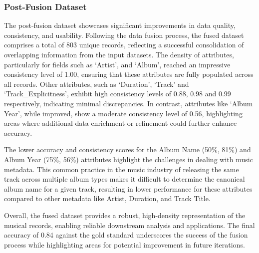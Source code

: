 \documentclass[runningheads]{llncs}
\begin{document}
\subsubsection{Post-Fusion Dataset}
The post-fusion dataset showcases significant improvements in data quality, consistency, and usability. Following the data fusion process, the fused dataset comprises a total of 803 unique records, reflecting a successful consolidation of overlapping information from the input datasets. The density of attributes, particularly for fields such as `Artist', and `Album', reached an impressive consistency level of 1.00, ensuring that these attributes are fully populated across all records. Other attributes, such as `Duration', `Track' and `Track\_Explicitness', exhibit high consistency levels of 0.88, 0.98 and 0.99 respectively, indicating minimal discrepancies. In contrast, attributes like `Album Year', while improved, show a moderate consistency level of 0.56, highlighting areas where additional data enrichment or refinement could further enhance accuracy.

The lower accuracy and consistency scores for the Album Name (50\%, 81\%) and Album Year (75\%, 56\%) attributes highlight the challenges in dealing with music metadata. This common practice in the music industry of releasing the same track across multiple album types makes it difficult to determine the canonical album name for a given track, resulting in lower performance for these attributes compared to other metadata like Artist, Duration, and Track Title.

Overall, the fused dataset provides a robust, high-density representation of the musical records, enabling reliable downstream analysis and applications. The final accuracy of 0.84 against the gold standard underscores the success of the fusion process while highlighting areas for potential improvement in future iterations.
\end{document}
